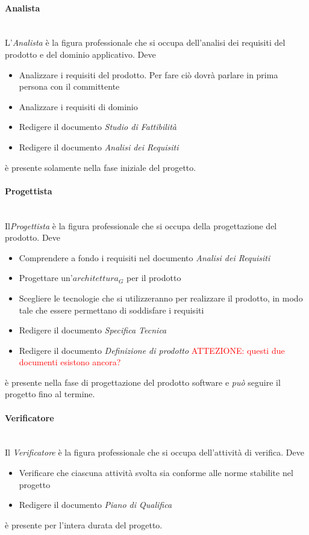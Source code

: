 		\paragraph{Analista} \mbox{} \\
		L'\emph{Analista} è la figura professionale che si occupa dell'analisi dei requisiti del prodotto e del dominio applicativo. Deve
		\begin{itemize}
			\item Analizzare i requisiti del prodotto. Per fare ciò dovrà parlare in prima persona con il committente
			\item Analizzare i requisiti di dominio
			\item Redigere il documento \emph{Studio di Fattibilità}
			\item Redigere il documento \emph{Analisi dei Requisiti}
		\end{itemize}
		è presente solamente nella fase iniziale del progetto.
		\paragraph{Progettista} \mbox{} \\
		Il\emph{Progettista} è la figura professionale che si occupa della progettazione del prodotto. Deve
		\begin{itemize}
			\item Comprendere a fondo i requisiti nel documento \emph{Analisi dei Requisiti}
			\item Progettare un'$architettura_G$ per il prodotto
			\item Scegliere le tecnologie che si utilizzeranno per realizzare il prodotto, in modo tale che essere permettano di soddisfare i requisiti
			\item Redigere il documento \emph{Specifica Tecnica}
			\item Redigere il documento \emph{Definizione di prodotto} \textcolor{red}{ATTEZIONE: questi due documenti esistono ancora?}
		\end{itemize}
		è presente nella fase di progettazione del prodotto software e \emph{può} seguire il progetto fino al termine.
		\paragraph{Verificatore} \mbox{} \\
		Il \emph{Verificatore} è la figura professionale che si occupa dell'attività di verifica. Deve
		\begin{itemize}
			\item Verificare che ciascuna attività svolta sia conforme alle norme stabilite nel progetto
			\item Redigere il documento \emph{Piano di Qualifica}
		\end{itemize}
		è presente per l'intera durata del progetto.
